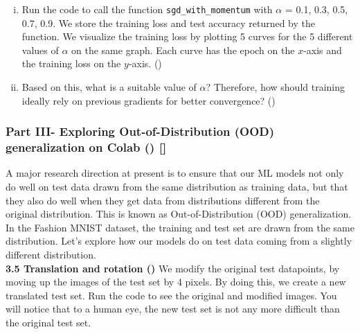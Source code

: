 \begin{enumerate}[(i).]
    \item Run the code to call the function \texttt{sgd\_with\_momentum} with $\alpha$ = 0.1, 0.3, 0.5, 0.7, 0.9. We store the training loss and test accuracy returned by the function.
    We visualize the training loss by plotting 5 curves for the 5 different values of $\alpha$ on the same graph. Each curve has the epoch on the $x$-axis and the training loss on the $y$-axis. ()
    \item Based on this, what is a suitable value of $\alpha$? Therefore, how should training ideally rely on previous gradients for better convergence? ()
\end{enumerate}


\newpage
\subsubsection*{Part III- Exploring Out-of-Distribution (OOD) generalization on Colab () []}


A major research direction at present is to ensure that our ML models not only do well on test data drawn from the same distribution as training data, but that they also do well when they get data from distributions different from the original distribution. This is known as Out-of-Distribution (OOD) generalization. In the Fashion MNIST dataset, the training and test set are drawn from the same distribution. Let's explore how our models do on test data coming from a slightly different distribution.\\

\textbf{3.5 Translation and rotation ()} We modify the original test datapoints, by moving up the images of the test set by 4 pixels. By doing this, we create a new translated test set. Run the code to see the original and modified images. You will notice that to a human eye, the new test set is not any more difficult than the original test set.

